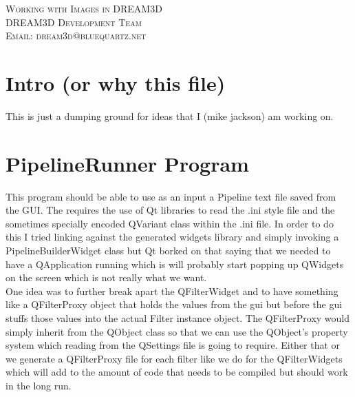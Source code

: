 \documentclass[12pt]{article} %
\begin{document}
\begin{center}
\textsc{\huge Working with Images in DREAM3D}\\[1.5cm]
\textsc{\large DREAM3D Development Team\\
Email: dream3d@bluequartz.net}\\[1.5cm]
\end{center}

{}
\section{Intro (or why this file)}
  This is just a dumping ground for ideas that I (mike jackson) am working on.

\section{PipelineRunner Program}
  This program should be able to use as an input a Pipeline text file saved from the GUI. The requires the use of Qt libraries to read the .ini style file and the sometimes specially encoded QVariant class within the .ini file. In order to do this I tried linking against the generated widgets library and simply invoking a PipelineBuilderWidget class but Qt borked on that saying that we needed to have a QApplication running which is will probably start popping up QWidgets on the screen which is not really what we want.\\
  
  
 One idea was to further break apart the QFilterWidget and to have something like a QFilterProxy object that holds the values from the gui but before the gui stuffs those values into the actual Filter instance object. The QFilterProxy would simply inherit from the QObject class so that we can use the QObject's property system which reading from the QSettings file is going to require. Either that or we generate a QFilterProxy file for each filter like we do for the QFilterWidgets which will add to the amount of code that needs to be compiled but should work in the long run.
\end{document}
